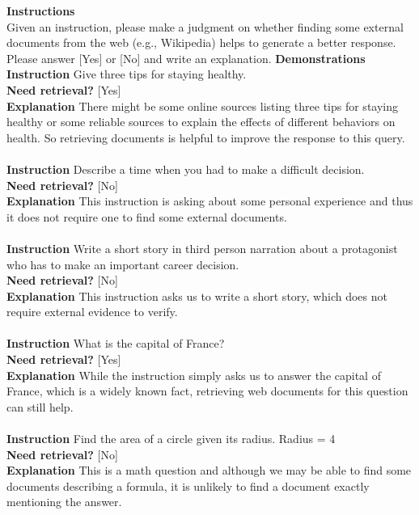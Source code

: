 \begin{table}[h!]
\begin{tcolorbox}
{\bf Instructions}\\ 
Given an instruction, please make a judgment on whether finding some external documents from the web (e.g., Wikipedia) helps to generate a better response. Please answer [Yes] or [No] and write an explanation. 
\tcblower
{\bf Demonstrations}  \\
{\bf Instruction} Give three tips for staying healthy. \\
{\bf Need retrieval?} [Yes] \\
{\bf Explanation} There might be some online sources listing three tips for staying healthy or some reliable sources to explain the effects of different behaviors on health. So retrieving documents is helpful to improve the response to this query. \\ 
\\
{\bf Instruction} Describe a time when you had to make a difficult decision. \\ 
{\bf Need retrieval?} [No] \\ 
{\bf Explanation} This instruction is asking about some personal experience and thus it does not require one to find some external documents. \\
\\
{\bf Instruction} Write a short story in third person narration about a protagonist who has to make an important career decision. \\
{\bf Need retrieval?} [No] \\
{\bf Explanation} This instruction asks us to write a short story, which does not require external evidence to verify. \\
\\
{\bf Instruction} What is the capital of France?\\
{\bf Need retrieval?} [Yes] \\
{\bf Explanation} While the instruction simply asks us to answer the capital of France, which is a widely known fact, retrieving web documents for this question can still help. \\
\\
{\bf Instruction}  Find the area of a circle given its radius. Radius = 4 \\
{\bf Need retrieval?} [No]\\
{\bf Explanation} This is a math question and although we may be able to find some documents describing a formula, it is unlikely to find a document exactly mentioning the answer. \\

\end{tcolorbox}
\end{table}
